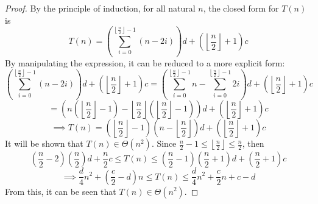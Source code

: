 \documentclass[11pt]{article}
\begin{document}
\begin{enumerate}
\begin{proof}
            By the principle of induction, for all natural \(n\), the closed form for \(T(n)\) is
            \[
                T(n)=\left(\sum_{i=0}^{\left\lfloor \frac{n}{2} \right\rfloor - 1} (n-2i)\right) d + \left(\left\lfloor\frac{n}{2}\right\rfloor + 1\right) c
            \]
            By manipulating the expression, it can be reduced to a more explicit form:
            \[
                \left(\sum_{i=0}^{\left\lfloor \frac{n}{2} \right\rfloor - 1} (n-2i)\right) d + \left(\left\lfloor\frac{n}{2}\right\rfloor + 1\right) c = \left(\sum_{i=0}^{\left\lfloor \frac{n}{2} \right\rfloor - 1} n - \sum_{i=0}^{\left\lfloor \frac{n}{2} \right\rfloor - 1} 2i \right) d + \left(\left\lfloor\frac{n}{2}\right\rfloor + 1\right) c
            \]
            \[
                = \left(n\left(\left\lfloor \frac{n}{2} \right\rfloor - 1\right) - \left\lfloor \frac{n}{2} \right\rfloor \left( \left\lfloor \frac{n}{2} \right\rfloor - 1 \right)  \right) d + \left(\left\lfloor\frac{n}{2}\right\rfloor + 1\right) c
            \]
            \[
                \implies T(n) = \left(\left\lfloor \frac{n}{2} \right\rfloor - 1\right)\left( n - \left\lfloor \frac{n}{2} \right\rfloor\right) d + \left(\left\lfloor\frac{n}{2}\right\rfloor + 1\right) c
            \]
            It will be shown that \(T(n) \in \Theta (n^2)\). Since \(\frac{n}{2} - 1 \leq \left\lfloor \frac{n}{2} \right\rfloor \leq \frac{n}{2}\), then
            \[
                \left( \frac{n}{2} - 2 \right)\left( \frac{n}{2} \right)d + \frac{n}{2} c \leq T(n) \leq \left( \frac{n}{2} - 1 \right)\left( \frac{n}{2} + 1 \right)d + \left( \frac{n}{2} + 1 \right)c
            \]
            \[
                \implies \frac{d}{4}n^2 + \left( \frac{c}{2} - d \right) n \leq T(n) \leq \frac{d}{4}n^2 + \frac{c}{2}n + c - d
            \]
            From this, it can be seen that \(T(n) \in \Theta (n^2)\).

        \end{proof}
    \end{enumerate}
\end{document}
